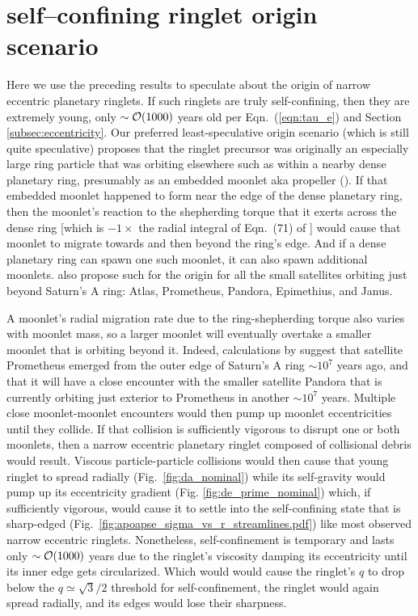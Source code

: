 \documentclass[preprint]{aastex62}
\begin{document}
\section{self--confining ringlet origin scenario}
\label{sec:origin}

Here we use the preceding results to speculate about the origin of narrow eccentric planetary ringlets.
If such ringlets are truly self-confining, then they are extremely young, only $\sim{\cal O}(1000)$ years 
old per Eqn.\ (\ref{eqn:tau_e}) and Section \ref{subsec:eccentricity}. Our preferred least-speculative origin scenario 
(which is still quite speculative) proposes that
the ringlet precursor was originally an especially large ring particle that was orbiting elsewhere such as
within a nearby dense planetary ring, presumably as an embedded moonlet aka propeller (\citealt{Tetal10}). 
If that embedded moonlet happened to 
form near the edge of the dense planetary ring, then the moonlet's reaction to
the shepherding torque that it exerts across the dense ring [which is $-1\times$ 
the radial integral of Eqn.\ (71) of \cite{GT82}] would
cause that moonlet to migrate towards and then beyond the ring's edge. And if a dense planetary ring can spawn
one such moonlet, it can also spawn additional moonlets. \cite{CSC10} also propose such 
for the origin for all the small satellites orbiting just beyond Saturn's A ring:
Atlas, Prometheus, Pandora, Epimethius, and Janus.

A moonlet's radial migration rate due to the ring-shepherding torque also
varies with moonlet mass, so a larger moonlet will eventually overtake a smaller moonlet that is orbiting beyond it.
Indeed, calculations by \cite{PS01} suggest that satellite Prometheus emerged from the outer edge of Saturn's A
ring $\sim10^7$ years ago, and that it will have a close encounter with the smaller satellite
Pandora that is currently orbiting just exterior to Prometheus in another $\sim10^7$ years.
Multiple close moonlet-moonlet encounters would then pump up moonlet eccentricities until they collide. If that collision
is sufficiently vigorous to disrupt one or both moonlets, then a narrow eccentric planetary ringlet composed of
collisional debris would result. Viscous particle-particle
collisions would then cause that young ringlet to spread radially (Fig.\ \ref{fig:da_nominal}) 
while its self-gravity would pump up its eccentricity gradient (Fig. \ref{fig:de_prime_nominal})
which, if sufficiently vigorous, would cause it to settle into the self-confining state that is
sharp-edged (Fig.\ \ref{fig:apoapse_sigma_vs_r_streamlines.pdf}) like most observed narrow eccentric ringlets. 
Nonetheless, self-confinement is temporary
and lasts only $\sim{\cal O}(1000)$ years due to the ringlet's viscosity damping its eccentricity until its inner edge gets circularized. Which would would cause the ringlet's $q$ to drop below the $q\simeq\sqrt{3}/2$ threshold
for self-confinement, the ringlet would again spread radially, and its edges would lose their sharpness.
\end{document}
